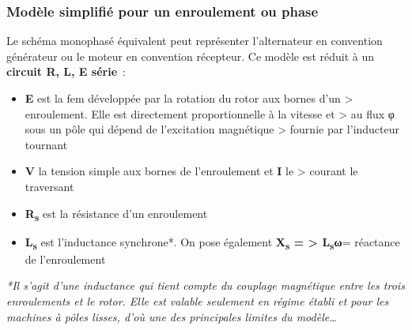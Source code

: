 \hypertarget{moduxe8le-simplifiuxe9-pour-un-enroulement-ou-phase}{%
\subsubsection{Modèle simplifié pour un enroulement ou phase}\label{moduxe8le-simplifiuxe9-pour-un-enroulement-ou-phase}}

Le schéma monophasé équivalent peut représenter l'alternateur en convention générateur ou le moteur en convention récepteur. Ce modèle est réduit à un \textbf{circuit R, L, E série}~:

\begin{itemize}
\item
  \textbf{E} est la fem développée par la rotation du rotor aux bornes d'un \textgreater{} enroulement. Elle est directement proportionnelle à la vitesse et \textgreater{} au flux φ sous un pôle qui dépend de l'excitation magnétique \textgreater{} fournie par l'inducteur tournant
\item
  \textbf{V} la tension simple aux bornes de l'enroulement et \textbf{I} le \textgreater{} courant le traversant
\item
  \textbf{R\textsubscript{s}} est la résistance d'un enroulement
\item
  \textbf{L\textsubscript{s}} est l'inductance synchrone*. On pose également \textbf{X\textsubscript{s} = \textgreater{} L\textsubscript{s}ω}= réactance de l'enroulement
\end{itemize}

\emph{*Il s'agit d'une inductance qui tient compte du couplage magnétique entre les trois enroulements et le rotor. Elle est valable seulement en régime établi et pour les machines à pôles lisses, d'où une des principales limites du modèle\ldots{}}

